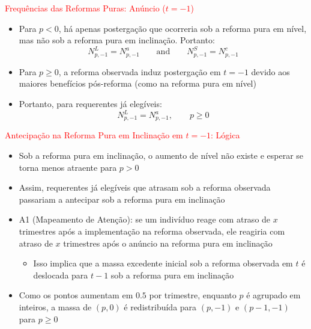 \begin{frame}{\textcolor{red}{Frequências das Reformas Puras: Anúncio ($t=-1$)}}
\begin{itemize}
    \item Para $p<0$, há apenas postergação que ocorreria sob a reforma pura em nível, mas não sob a reforma pura em inclinação. Portanto:
    \[
    N^L_{p,-1}=N^a_{p,-1}
    \qquad\text{and}\qquad
    N^S_{p,-1}=N^c_{p,-1}
    \]
    \item Para $p\geq 0$, a reforma observada induz postergação em $t=-1$ devido aos maiores benefícios pós-reforma (como na reforma pura em nível)
    \item Portanto, para requerentes já elegíveis:
    \[
    N^L_{p,-1}=N^a_{p,-1}, \qquad p\geq 0
    \]
\end{itemize}
\end{frame}

\begin{frame}{\textcolor{red}{Antecipação na Reforma Pura em Inclinação em $t=-1$: Lógica}}
\begin{itemize}
    \item Sob a reforma pura em inclinação, o aumento de nível não existe e esperar se torna menos atraente para $p>0$
    \item Assim, requerentes já elegíveis que atrasam sob a reforma observada passariam a antecipar sob a reforma pura em inclinação
    \item A1 (Mapeamento de Atenção): se um indivíduo reage com atraso de $x$ trimestres após a implementação na reforma observada, ele reagiria com atraso de $x$ trimestres após o anúncio na reforma pura em inclinação
    \begin{itemize}
        \item Isso implica que a massa excedente inicial sob a reforma observada em $t$ é deslocada para $t-1$ sob a reforma pura em inclinação
    \end{itemize}
    \item Como os pontos aumentam em $0.5$ por trimestre, enquanto $p$ é agrupado em inteiros, a massa de $(p,0)$ é redistribuída para $(p,-1)$ e $(p-1,-1)$ para $p\geq 0$
\end{itemize}
\end{frame}

